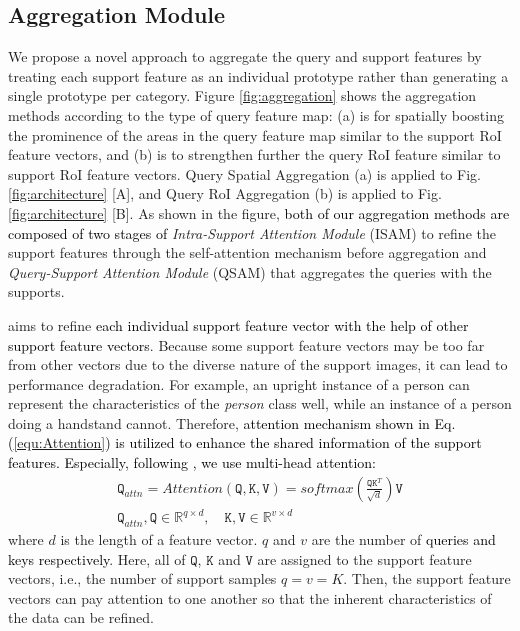 \documentclass[10pt,twocolumn,letterpaper]{article}
\newcommand{\nj}[1]{\textcolor{black}{#1}}
\begin{document}
\subsection{Aggregation Module}
\label{subsec:Aggregation}

We propose a novel approach to aggregate the query and support features by treating each support feature as an individual prototype rather than generating a single prototype per category. Figure \ref{fig:aggregation} shows the aggregation methods according to the type of query feature map: (a) is for spatially boosting the prominence of the areas in the query feature map similar to the support RoI feature vectors, and (b) is to strengthen further the query RoI feature similar to support RoI feature vectors. Query Spatial Aggregation (a) is applied to Fig. \ref{fig:architecture} [A], and Query RoI Aggregation (b) is applied to Fig. \ref{fig:architecture} [B].
As shown in the figure, \nj{both of our aggregation methods are composed of two stages of} \textit{Intra-Support Attention Module} (ISAM) to refine the support features through the self-attention mechanism before aggregation and \textit{Query-Support Attention Module} (QSAM) that aggregates the queries with the supports.


 aims to refine \nj{each individual support feature vector with the help of other support feature vectors}. Because some support feature vectors may be too far from other vectors due to the diverse nature of the support images, it can lead to performance degradation.
For example, an upright instance of a person can represent the characteristics of the \emph{person} class well, while an instance of a person doing a handstand cannot. 
Therefore, \nj{attention mechanism \cite{vaswani2017attention} shown in Eq. (\ref{equ:Attention}) is utilized to enhance the shared information of the support features. Especially, following  \cite{vaswani2017attention}, we use multi-head attention:}
\begin{equation} \label{equ:Attention}
\begin{split}
\mathtt{Q}_{attn}=Attention(\mathtt{Q}, \mathtt{K}, \mathtt{V})=softmax(\frac{\mathtt{Q} \mathtt{K}^{T}}{\sqrt{d}}) \mathtt{V} \\
\mathtt{Q}_{attn}, \mathtt{Q} \in \mathbb{R}^{q\times d}, \quad \mathtt{K}, \mathtt{V} \in \mathbb{R}^{v\times d} \quad
\end{split}
\end{equation}
where $d$ is the length of a feature vector. $q$ and $v$ are the number of \nj{queries and keys respectively}. Here, all of $\mathtt{Q}$, $\mathtt{K}$ and $\mathtt{V}$ are assigned to the support feature vectors, i.e., the number of support samples $q=v=K$. Then, the support feature vectors can pay attention to one another so that the inherent characteristics of the data can be refined.
\end{document}
